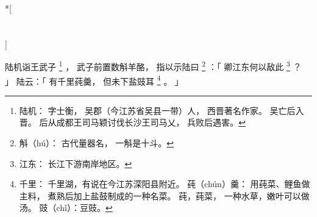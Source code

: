 
\switchcolumn[0]*[\section{}]

陆机诣王武子%
\footnote{%
    陆机：
        字士衡，
        吴郡（今江苏省吴县一带）人，
        西晋著名作家。
        吴亡后入晋。
        后从成都王司马颖讨伐长沙王司马乂，
        兵败后遇害。
}%
，
武子前置数斛羊酪，
指以示陆曰%
\footnote{%
    斛（hú）：
        古代量器名，
        一斛是十斗。
}%
：「
    卿江东何以敌此%
    \footnote{%
        江东：
            长江下游南岸地区。
    }%
    ？
」
陆云：「
    有千里莼羹，
    但未下盐豉耳%
    \footnote{%
        千里：
            千里湖，有说在今江苏深阳县附近。
        莼（chún）羹：
            用莼菜、鲤鱼做主料，
            煮熟后加上盐鼓制成的一种名菜。
            莼，莼菜，
            一种水草，嫩叶可以做汤。
            豉（chǐ）：豆豉。
    }%
    。
」

\switchcolumn


